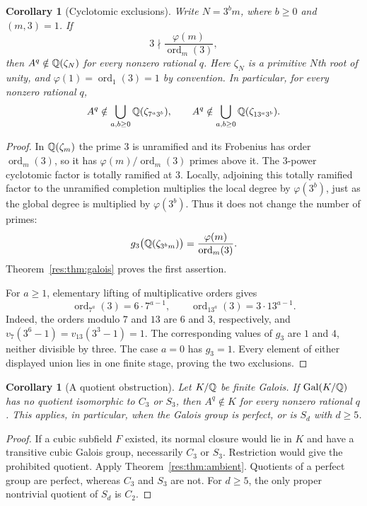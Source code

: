 \documentclass[11pt,a4paper]{article}
\newtheorem{corollary}[theorem]{Corollary}
\theoremstyle{remark}\newtheorem{remark}[theorem]{Remark}
\DeclareMathOperator{\ord}{ord}
\begin{document}
\begin{corollary}[Cyclotomic exclusions]
\label{res:cor:cyclotomic}
Write $N=3^b m$, where $b\ge0$ and $(m,3)=1$. If
\[
 3\nmid\frac{\varphi(m)}{\ord_m(3)},
\]
then $A^q\notin\mathbb Q(\zeta_N)$ for every nonzero rational $q$.
Here $\zeta_N$ is a primitive $N$th root of unity, and
$\varphi(1)=\ord_1(3)=1$ by convention. In particular, for every
nonzero rational $q$,
\[
 A^q\notin\bigcup_{a,b\ge0}\mathbb Q(\zeta_{7^a3^b}),
 \qquad
 A^q\notin\bigcup_{a,b\ge0}\mathbb Q(\zeta_{13^a3^b}).
\]
\end{corollary}
\begin{proof}
In $\mathbb Q(\zeta_m)$ the prime $3$ is unramified and its Frobenius has
order $\ord_m(3)$, so it has
$\varphi(m)/\ord_m(3)$ primes above it. The $3$-power cyclotomic
factor is totally ramified at $3$. Locally, adjoining this totally
ramified factor to the unramified completion multiplies the local
degree by $\varphi(3^b)$, just as the global degree is multiplied
by $\varphi(3^b)$. Thus it does not change the number of primes:
\[
 g_3\bigl(\Q(\zeta_{3^b m})\bigr)
 =\frac{\varphi(m)}{\ord_m(3)}.
\]
Theorem~\ref{res:thm:galois} proves the first assertion.

For $a\ge1$, elementary lifting of multiplicative orders gives
\[
 \ord_{7^a}(3)=6\cdot7^{a-1},\qquad
 \ord_{13^a}(3)=3\cdot13^{a-1}.
\]
Indeed, the orders modulo $7$ and $13$ are $6$ and $3$, respectively,
and $v_7(3^6-1)=v_{13}(3^3-1)=1$. The corresponding values of
$g_3$ are $1$ and $4$, neither divisible by three. The case $a=0$
has $g_3=1$. Every element of either displayed union lies in one
finite stage, proving the two exclusions.
\end{proof}

\begin{corollary}[A quotient obstruction]
\label{res:cor:quotient}
Let $K/\mathbb Q$ be finite Galois. If
$\operatorname{Gal}(K/\mathbb Q)$ has no quotient isomorphic to $C_3$ or
$S_3$, then $A^q\notin K$ for every nonzero rational $q$.
This applies, in particular, when the Galois group is perfect, or
is $S_d$ with $d\ge5$.
\end{corollary}
\begin{proof}
If a cubic subfield $F$ existed, its normal closure would lie in
$K$ and have a transitive cubic Galois group, necessarily $C_3$ or
$S_3$. Restriction would give the prohibited quotient. Apply
Theorem~\ref{res:thm:ambient}. Quotients of a perfect group are
perfect, whereas $C_3$ and $S_3$ are not. For $d\ge5$, the only
proper nontrivial quotient of $S_d$ is $C_2$.
\end{proof}
\end{document}
